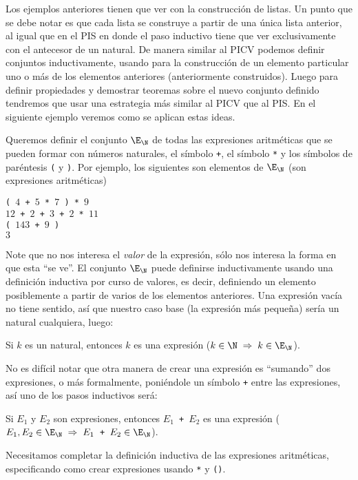 Los ejemplos anteriores tienen que ver con la construcción de listas.
Un punto que se debe notar es que cada lista se construye a partir de una única lista anterior, al igual que en el PIS en donde el paso inductivo tiene que ver exclusivamente con el antecesor de un natural.
De manera similar al PICV podemos definir conjuntos inductivamente, usando para la construcción de un elemento particular uno o más de los elementos anteriores (anteriormente construidos).
Luego para definir propiedades y demostrar teoremas sobre el nuevo conjunto definido tendremos que usar una estrategia más similar al PICV que al PIS.
En el siguiente ejemplo veremos como se aplican estas ideas.

\begin{ejemplo}
Queremos definir el conjunto $\E_{\N}$ de todas las expresiones aritméticas que se pueden formar con números naturales, el símbolo \texttt{+}, el símbolo \texttt{*} y los símbolos de paréntesis \texttt{(} y \texttt{)}.
	Por ejemplo, los siguientes son elementos de $\E_{\N}$ (son expresiones aritméticas)
	\begin{center}
	\texttt{( $4$ + $5$ * $7$ ) * $9$} \\
	\texttt{$12$ + $2$ + $3$ + $2$ * $11$} \\
	\texttt{( $143$ + $9$ )} \\
	\texttt{$3$}
	\end{center}
	Note que no nos interesa el \emph{valor} de la expresión, sólo nos interesa la forma en que esta ``se ve''.
	El conjunto $\E_\N$ puede definirse inductivamente usando una definición inductiva por curso de valores, es decir, definiendo un elemento posiblemente a partir de varios de los elementos anteriores.
	Una expresión vacía no tiene sentido, así que nuestro caso base (la expresión más pequeña) sería un natural cualquiera, luego:
	\begin{center}
	Si $k$ es un natural, entonces $k$ es una expresión ($k\in\N\;\Rightarrow\;k\in\E_\N$).
	\end{center}
	No es difícil notar que otra manera de crear una expresión es ``sumando'' dos expresiones, o más formalmente, poniéndole un símbolo \texttt{+} entre las expresiones, así uno de los pasos inductivos será:
	\begin{center}
	Si $E_1$ y $E_2$ son expresiones, entonces \texttt{$E_1$ + $E_2$} es una expresión (\texttt{$E_1,E_2\in\E_\N\;\Rightarrow\;E_1$ + $E_2\in\E_\N$}).
	\end{center}
	Necesitamos completar la definición inductiva de las expresiones aritméticas, especificando como crear expresiones usando \texttt{*} y \texttt{()}.

\end{ejemplo}
